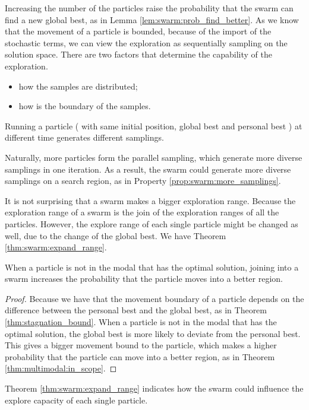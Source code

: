 Increasing the number of the particles raise the probability that the swarm can find a new global best, as in Lemma \ref{lem:swarm:prob_find_better}.
As we know that the movement of a particle is bounded, because of the import of the stochastic terms, we can view the exploration as sequentially sampling on the solution space.
There are two factors that determine the capability of the exploration.
\begin{itemize}
\item how the samples are distributed;
\item how is the boundary of the samples.
\end{itemize}

\begin{myprop}
\label{prop:swarm:more_samplings}
Running a particle ( with same initial position, global best and personal best ) at different time generates different samplings.
\end{myprop}
Naturally, more particles form the parallel sampling, which generate more diverse samplings in one iteration.
As a result, the swarm could generate more diverse samplings on a search region, as in Property \ref{prop:swarm:more_samplings}.

It is not surprising that a swarm makes a bigger exploration range.
Because the exploration range of a swarm is the join of the exploration ranges of all the particles.
However, the explore range of each single particle might be changed as well, due to the change of the global best.
We have Theorem \ref{thm:swarm:expand_range}.

\begin{mythm}
\label{thm:swarm:expand_range}
When a particle is not in the modal that has the optimal solution, joining into a swarm increases the probability that the particle moves into a better region.
\begin{proof}
Because we have that the movement boundary of a particle depends on the difference between the personal best and the global best, as in Theorem \ref{thm:stagnation_bound}.
When a particle is not in the modal that has the optimal solution, the global best is more likely to deviate from the personal best.
This gives a bigger movement bound to the particle, which makes a higher probability that the particle can move into a better region, as in Theorem \ref{thm:multimodal:in_scope}.
\end{proof}
\end{mythm}

Theorem \ref{thm:swarm:expand_range} indicates how the swarm could influence the explore capacity of each single particle.

